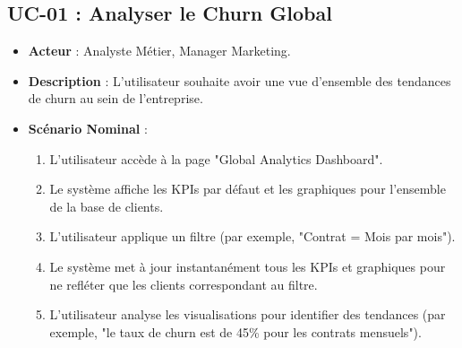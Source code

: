 \subsection{UC-01 : Analyser le Churn Global}
\begin{itemize}
    \item \textbf{Acteur} : Analyste Métier, Manager Marketing.
    \item \textbf{Description} : L'utilisateur souhaite avoir une vue d'ensemble des tendances de churn au sein de l'entreprise.
    \item \textbf{Scénario Nominal} :
    \begin{enumerate}
        \item L'utilisateur accède à la page "Global Analytics Dashboard".
        \item Le système affiche les KPIs par défaut et les graphiques pour l'ensemble de la base de clients.
        \item L'utilisateur applique un filtre (par exemple, "Contrat = Mois par mois").
        \item Le système met à jour instantanément tous les KPIs et graphiques pour ne refléter que les clients correspondant au filtre.
        \item L'utilisateur analyse les visualisations pour identifier des tendances (par exemple, "le taux de churn est de 45\% pour les contrats mensuels").
    \end{enumerate}
\end{itemize}

